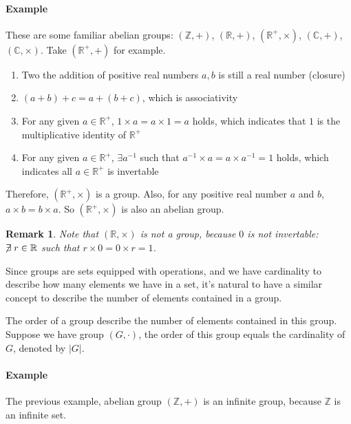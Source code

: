 \documentclass[UTF8]{ctexart}
\theoremstyle{mystyle}
\theoremstyle{myremark}
\newtheorem*{remark}{Remark}
\theoremstyle{plain}
\newcommand{\R}{\mathbb R}
\newcommand{\Z}{\mathbb Z}
\newcommand{\C}{\mathbb C}
\begin{document}
\paragraph{Example}
These are some familiar abelian groups: $ (\Z, +) $, $ (\R, +) $, $ (\R^+, \times) $, $ (\C, +) $, $ (\C, \times) $. Take $ (\R^+, +) $ for example. 

\begin{enumerate}
    \item Two the addition of positive real numbers $ a, b $ is still a real number (closure)
    \item $ (a + b) + c = a + (b + c) $, which is associativity
    \item For any given $ a \in \R^+ $, $ 1 \times a = a \times 1 = a $ holds, which indicates that $ 1 $ is the multiplicative identity of $ \R^+ $
    \item For any given $ a \in \R^+ $, $ \exists a^{-1} $ such that $ a^{-1} \times a = a \times a^{-1} = 1 $ holds, which indicates all $ a \in \R^+ $ is invertable
\end{enumerate}

Therefore, $ (\R^+, \times) $ is a group. Also, for any positive real number $ a $ and $ b $, $ a \times b = b \times a $. So $ (\R^+, \times) $ is also an abelian group.


\begin{remark}
    Note that $ (\R, \times) $ is not a group, because $ 0 $ is not invertable: $ \centernot\exists r \in \R $ such that $ r \times 0 = 0 \times r = 1 $.
\end{remark}

Since groups are sets equipped with operations, and we have cardinality to describe how many elements we have in a set, it's natural to have a similar concept to describe the number of elements contained in a group.

\begin{definition}
    The order of a group describe the number of elements contained in this group. Suppose we have group $ (G, \cdot) $, the order of this group equals the cardinality of $ G $, denoted by $ |G| $.
\end{definition}

\paragraph{Example}
The previous example, abelian group $ (\Z, +) $ is an infinite group, because $ \Z $ is an infinite set.
\end{document}
